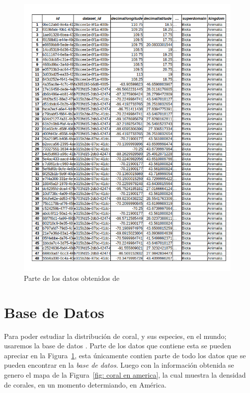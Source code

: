 \documentclass[12pt]{article}
\begin{document}
	\begin{figure}[p]
		\centering
			\includegraphics[width=0.98\textwidth]{tabla.png}
		\caption{Parte de los datos obtenidos de \cite{db}}
		\label{fig: tabla de datos}
	\end{figure}



\section{Base de Datos}
	
	\par Para poder estudiar la distribución de coral, y sus especies, en el mundo; usaremos la base de datos \cite{db}. Parte de los datos que contiene esta se pueden apreciar en la Figura~\ref{fig: tabla de datos}, esta \'unicamente contien parte de todo los datos que se pueden encontrar en la \textit{base de datos}. Luego con la informaci\'on obtenida se genero el mapa de la Figura~\ref{fig: coral en america}, la cual muestra la densidad de corales, en un momento determiando, en Am\'erica. 
\end{document}
